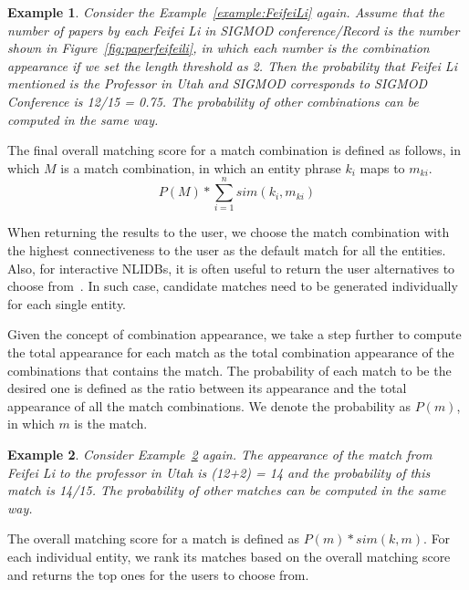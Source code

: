 \documentclass{vldb}
\newtheorem{example}{Example}
\begin{document}
\begin{example}
\label{example:appearance}
Consider the Example~\ref{example:FeifeiLi} again.  Assume that the number of papers by each Feifei Li in SIGMOD conference/Record is the number shown in Figure~\ref{fig:paperfeifeili}, in which each number is the combination appearance if we set the length threshold as 2.  Then the probability that Feifei Li mentioned is the Professor in Utah and SIGMOD corresponds to SIGMOD Conference is 12/15 = 0.75.  The probability of other combinations can be computed in the same way.  
\end{example}

The final overall matching score for a match combination is defined as follows, in which $M$ is a match combination, in which an entity phrase $k_i$ maps to $m_{ki}$.    
\begin{displaymath}
\mathit{P(M) * \sum_{i=1}^{n}} sim(k_i, m_{ki})
\end{displaymath}

When returning the results to the user, we choose the match combination with the highest connectiveness to the user as the default match for all the entities.  Also, for interactive NLIDBs, it is often useful to return the user alternatives to choose from~\cite{DBLP:journals/pvldb/LiJ14}.  In such case, candidate matches need to be generated individually for each single entity.  

Given the concept of combination appearance, we take a step further to compute the total appearance for each match as the total combination appearance of the combinations that contains the match.  The probability of each match to be the desired one is defined as the ratio between its appearance and the total appearance of all the match combinations.  We denote the probability as $P(m)$, in which $m$ is the match. 

\begin{example}
\label{example:appearance}
Consider Example~\ref{example:appearance} again. The appearance of the match from Feifei Li to the professor in Utah is (12+2) = 14 and the probability of this match is 14/15. The probability of other matches can be computed in the same way. 
\end{example}

The overall matching score for a match is defined as $P(m) * sim(k, m)$.  For each individual entity, we rank its matches based on the overall matching score and returns the top ones for the users to choose from.  
\end{document}
